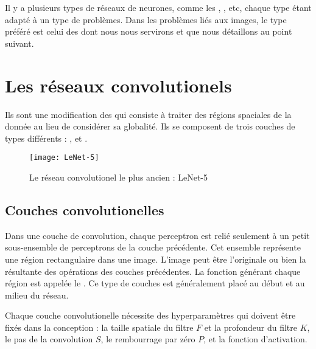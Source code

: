 Il y a plusieurs types de réseaux de neurones, comme
les , , etc,
chaque type étant adapté à un type de problèmes.
Dans les problèmes liés aux images, le type préféré est celui des
 dont nous nous servirons et que nous détaillons
au point suivant.

\section{Les réseaux convolutionels}

Ils sont une modification des  qui consiste à
traiter des régions spaciales de la donnée au lieu de considérer sa globalité.
Ils se composent de trois couches de types différents :
,
 et
.

\begin{figure}[h]
\begin{center}
\texttt{[image: LeNet-5]}
\caption{Le réseau convolutionel le plus ancien : LeNet-5}{\cite{lecun1998gradient}}
\end{center}
\end{figure}

\subsection{Couches convolutionelles}

Dans une couche de convolution, chaque perceptron est relié seulement à un petit
sous-ensemble de perceptrons de la couche précédente. Cet ensemble représente
une région rectangulaire dans une image. L'image peut être l'originale ou
bien la résultante des opérations des couches précédentes. La fonction générant
chaque région est appelée le . Ce type de couches est généralement
placé au début et au milieu du réseau.

Chaque couche convolutionelle nécessite des hyperparamètres qui doivent
être fixés dans la conception : la taille spatiale du filtre $F$ et la
profondeur du filtre $K$, le pas de la convolution $S$, le rembourrage par zéro
$P$, et la fonction d'activation.

